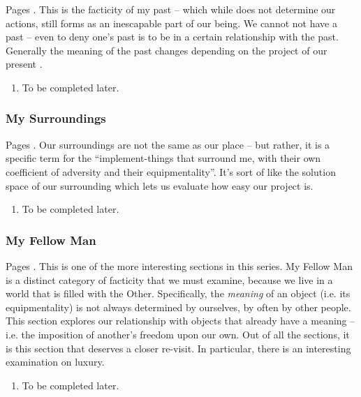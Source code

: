 Pages \autocite[646 -- 657]{sartre}. This is the facticity of my past -- which while does not determine our actions, still forms as an inescapable part of our being. We cannot not have a past -- even to deny one's past is to be in a certain relationship with the past. Generally the meaning of the past changes depending on the project of our present \autocite[649]{sartre}.

\begin{enumerate}
  \item To be completed later.
\end{enumerate}

\subsubsection{My Surroundings}

Pages \autocite[657 -- 663]{sartre}. Our surroundings are not the same as our place -- but rather, it is a specific term for the \enquote{implement-things that surround me, with their own coefficient of adversity and their equipmentality}. It's sort of like the solution space of our surrounding which lets us evaluate how easy our project is.

\begin{enumerate}
  \item To be completed later.
\end{enumerate}

\subsubsection{My Fellow Man}

Pages \autocite[663 -- 689]{sartre}.  This is one of the more interesting sections in this series. My Fellow Man is a distinct category of facticity that we must examine, because we live in a world that is filled with the Other. Specifically, the \emph{meaning} of an object (i.e. its equipmentality) is not always determined by ourselves, by often by other people. This section explores our relationship with objects that already have a meaning -- i.e. the imposition of another's freedom upon our own. Out of all the sections, it is this section that deserves a closer re-visit. In particular, there is an interesting examination on luxury.

\begin{enumerate}
  \item To be completed later.
\end{enumerate}

